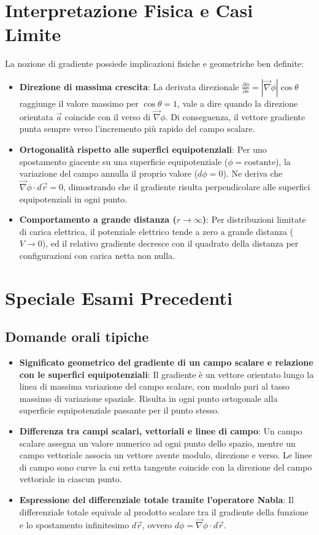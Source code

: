 \documentclass[12pt, a4paper]{article}
\begin{document}
\section{Interpretazione Fisica e Casi Limite}

La nozione di gradiente possiede implicazioni fisiche e geometriche ben definite:
\begin{itemize}
    \item \textbf{Direzione di massima crescita}: La derivata direzionale $\frac{\partial \phi}{\partial s} = |\vec{\nabla}\phi|\cos\theta$ raggiunge il valore massimo per $\cos\theta = 1$, vale a dire quando la direzione orientata $\vec{a}$ coincide con il verso di $\vec{\nabla}\phi$. Di conseguenza, il vettore gradiente punta sempre verso l'incremento più rapido del campo scalare.
    \item \textbf{Ortogonalità rispetto alle superfici equipotenziali}: Per uno spostamento giacente su una superficie equipotenziale ($\phi = \text{costante}$), la variazione del campo annulla il proprio valore ($d\phi = 0$). Ne deriva che $\vec{\nabla}\phi \cdot d\vec{r} = 0$, dimostrando che il gradiente risulta perpendicolare alle superfici equipotenziali in ogni punto.
    \item \textbf{Comportamento a grande distanza ($r \to \infty$)}: Per distribuzioni limitate di carica elettrica, il potenziale elettrico tende a zero a grande distanza ($V \to 0$), ed il relativo gradiente decresce con il quadrato della distanza per configurazioni con carica netta non nulla.
\end{itemize}

\section{Speciale Esami Precedenti}

\subsection{Domande orali tipiche}
\begin{itemize}
    \item \textbf{Significato geometrico del gradiente di un campo scalare e relazione con le superfici equipotenziali}: Il gradiente è un vettore orientato lungo la linea di massima variazione del campo scalare, con modulo pari al tasso massimo di variazione spaziale. Risulta in ogni punto ortogonale alla superficie equipotenziale passante per il punto stesso.
    \item \textbf{Differenza tra campi scalari, vettoriali e linee di campo}: Un campo scalare assegna un valore numerico ad ogni punto dello spazio, mentre un campo vettoriale associa un vettore avente modulo, direzione e verso. Le linee di campo sono curve la cui retta tangente coincide con la direzione del campo vettoriale in ciascun punto.
    \item \textbf{Espressione del differenziale totale tramite l'operatore Nabla}: Il differenziale totale equivale al prodotto scalare tra il gradiente della funzione e lo spostamento infinitesimo $d\vec{r}$, ovvero $d\phi = \vec{\nabla}\phi \cdot d\vec{r}$.
\end{itemize}
\end{document}
